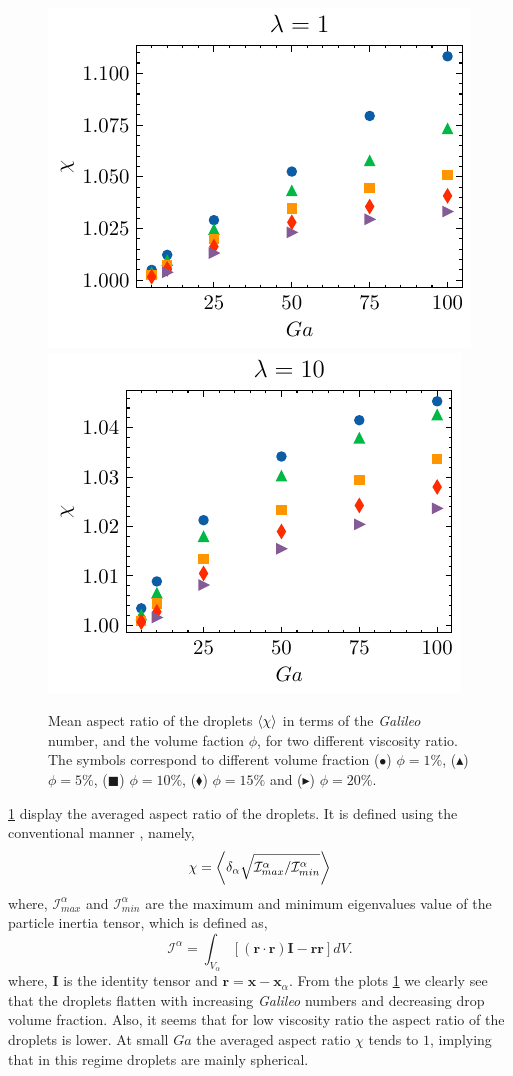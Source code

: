 \begin{figure}[h!]
    \centering
    \includegraphics[height = 0.35\textwidth]{image/HOMOGENEOUS/fPA/chi_mu_r_1-0.pdf}
    \includegraphics[height = 0.35\textwidth]{image/HOMOGENEOUS/fPA/chi_mu_r_0-1.pdf}
    \caption{Mean aspect ratio of the droplets $\left<\chi\right>$ in terms of the \textit{Galileo} number, and the volume faction $\phi$,  for two different viscosity ratio.  
    The symbols correspond to different volume fraction ($\bullet$) $\phi = 1\%$, ($\blacktriangle$) $\phi = 5\%$, ($\blacksquare$) $\phi = 10\%$, ($\blacklozenge$) $\phi = 15\%$ and ($\blacktriangleright$) $\phi = 20$\%.
    }
    \label{fig:chi}
\end{figure}
\ref{fig:chi} display the averaged aspect ratio of the droplets.
It is defined using the conventional manner \citep{bunner2003effect}, namely,
\begin{equation}
    \chi = \left<\delta_\alpha \sqrt{\mathcal{I}_{max}^\alpha /\mathcal{I}_{min}^\alpha} \right>
\end{equation} 
where, $\mathcal{I}_{max}^\alpha$ and $\mathcal{I}_{min}^\alpha$ are the maximum and minimum eigenvalues value of the particle inertia tensor, which is defined as, 
\begin{equation*}
    \mathcal{I}^\alpha
    = \int_{V_\alpha} \left[
        (\textbf{r}\cdot \textbf{r}) \textbf{I}  - \textbf{rr}
        \right]
    dV.
\end{equation*}
where, \textbf{I} is the identity tensor and $\textbf{r} = \textbf{x} - \textbf{x}_\alpha$. 
From the plots \ref{fig:chi} we clearly see that the droplets flatten with increasing \textit{Galileo} numbers and decreasing drop volume fraction. 
Also, it seems that for low viscosity ratio the aspect ratio of the droplets is lower. 
At small $Ga$ the averaged aspect ratio $\chi$ tends to $1$, implying that in this regime droplets are mainly spherical. 

